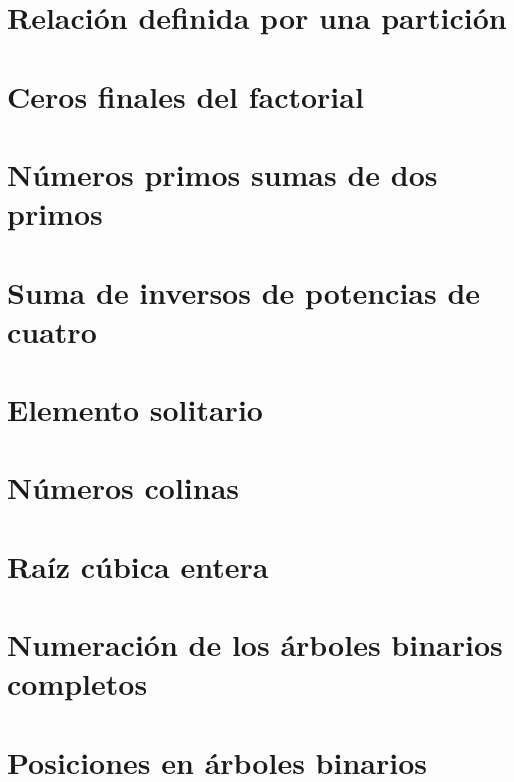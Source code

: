 \documentclass[a4paper,12pt,twoside]{book}
\begin{document}
\chapter{Relación definida por una partición}

\chapter{Ceros finales del factorial}

 
\chapter{Números primos sumas de dos primos}

\chapter{Suma de inversos de potencias de cuatro}

\chapter{Elemento solitario}

\chapter{Números colinas}

\chapter{Raíz cúbica entera}

\chapter{Numeración de los árboles binarios completos}
\label{031218}

\chapter{Posiciones en árboles binarios}
\label{041218}
\end{document}
